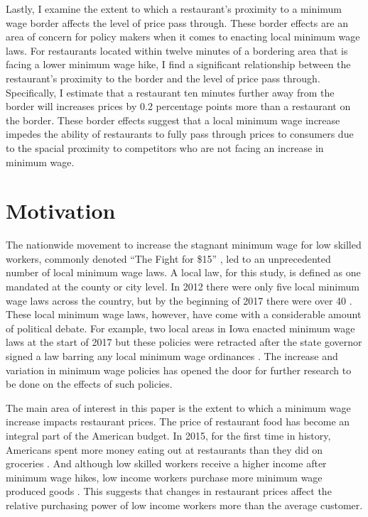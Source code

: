\documentclass[11pt]{article}
\begin{document}
Lastly, I examine the extent to which a restaurant's proximity to a minimum wage border affects the level of price pass through. These border effects are an area of concern for policy makers when it comes to enacting local minimum wage laws. For restaurants located within twelve minutes of a bordering area that is facing a lower minimum wage hike, I find a significant relationship between the restaurant's proximity to the border and the level of price pass through. Specifically, I estimate that a restaurant ten minutes further away from the border will increases prices by 0.2 percentage points more than a restaurant on the border. These border effects suggest that a local minimum wage increase impedes the ability of restaurants to fully pass through prices to consumers due to the spacial proximity to competitors who are not facing an increase in minimum wage. 


\section{Motivation}
The nationwide movement to increase the stagnant minimum wage for low skilled workers, commonly denoted ``The Fight for \$15'' \cite{ff15}, led to an unprecedented number of local minimum wage laws. A local law, for this study, is defined as one mandated at the county or city level. In 2012 there were only five local minimum wage laws across the country, but by the beginning of 2017 there were over 40 \cite{localmws}. These local minimum wage laws, however, have come with a considerable amount of political debate. For example, two local areas in Iowa enacted minimum wage laws at the start of 2017 but these policies were retracted after the state governor signed a law barring any local minimum wage ordinances \cite{ia}. The increase and variation in minimum wage policies has opened the door for further research to be done on the effects of such policies. 

The main area of interest in this paper is the extent to which a minimum wage increase impacts restaurant prices. The price of restaurant food has become an integral part of the American budget. In 2015, for the first time in history, Americans spent more money eating out at restaurants than they did on groceries \cite{usda}. And although low skilled workers receive a higher income after minimum wage hikes, low income workers purchase more minimum wage produced goods \cite{macurdy2000increasing}. This suggests that changes in restaurant prices affect the relative purchasing power of low income workers more than the average customer. 
\end{document}
